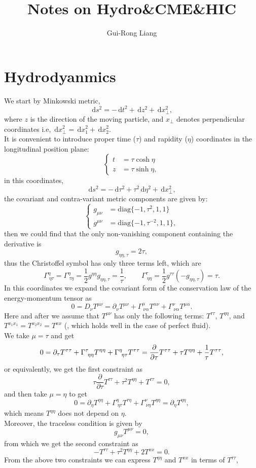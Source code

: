 \documentclass{article}
\title{Notes on Hydro\&CME\&HIC}
\author{Gui-Rong Liang}
\newcommand{\be}{\begin{equation}}
\newcommand{\ee}{\end{equation}}
\newcommand{\dif}{\,\mathrm{d}}
\newcommand{\p}{\partial}
\newcommand{\1}{\left}
\newcommand{\2}{\right}
\newcommand{\m}{\mu}
\newcommand{\n}{\nu}
\newcommand{\al}{\alpha}
\begin{document}
\maketitle
\tableofcontents
\newpage

\section{Hydrodyanmics}
We start by Minkowski metric,
\be
\dif s^2=-\dif t^2+\dif z^2+\dif x_{\perp}^2,
\ee 
where $z$ is the direction of the moving particle, and $x_\perp$ denotes perpendicular coordinates i.e, $\dif x_{\perp}^2=\dif x_{1}^2+\dif x_{2}^2$.\\
It is convenient to introduce proper time ($\tau$) and rapidity ($\eta$) coordinates in the longitudinal position plane:
\be\1\{\begin{split}
t&=\tau \cosh \eta\\
z&=\tau \sinh \eta,
\end{split}\2.\ee
in this coordinates,
\be
\dif s^2=-\dif \tau^2+\tau^2 \dif\eta^2 +\dif x_{\perp}^2,
\ee
the covariant and contra-variant metric components are given by:
\be\1\{\begin{split}
g_{\m\n}&=\text{diag}\{-1,\tau^2,1,1\}\\
g^{\m\n}&=\text{diag}\{-1,\tau^{-2},1,1\},
\end{split}\2.\ee
then we could find that the only non-vanishing component containing the derivative is 
\be
g_{\eta\eta,\tau}=2\tau,
\ee
thus the Christoffel symbol has only three terms left, which are
\be
\Gamma^\eta_{\ \eta\tau}=\Gamma^\eta_{\ \tau\eta}=\frac 1 2 g^{\eta\eta}g_{\eta\eta,\tau}=\frac 1 \tau, \qquad \Gamma^\tau_{\ \eta\eta}=\frac 1 2 g^{\tau\tau}(-g_{\eta\eta,\tau})=\tau.
\ee
In this coordinates we expand the covariant form of the conservation law of the energy-momentum tensor as 
\be
0=D_\n T^{\m\n}=\p_\n T^{\m\n}+\Gamma^\m_{\ \n\al}T^{\al\n}+\Gamma^\n_{\ \n\al}T^{\m\al}.
\ee
Here and after we assume that $T^{\m\n}$ has only the following terms: $T^{\tau\tau}$, $T^{\eta\eta}$, and $T^{x_1x_1}=T^{x_2x_2}=T^{xx}$ (, which holds well in the case of perfect fluid).\\
We take $\m=\tau$ and get 
\be
0=\p_\tau T^{\tau\tau}+\Gamma^\tau_{\ \eta\eta}T^{\eta\eta}+\Gamma^\eta_{\ \eta\tau}T^{\tau\tau}\\
=\frac \p {\p\tau} T^{\tau\tau}+\tau T^{\eta\eta}+\frac 1 \tau T^{\tau\tau},
\ee
or equivalently, we get the first constraint as
\be
\tau\frac \p {\p\tau} T^{\tau\tau}+\tau^2 T^{\eta\eta}+T^{\tau\tau}=0,
\ee
and then take $\m=\eta$ to get
\be
0=\p_\eta T^{\eta\eta}+\Gamma^\eta_{\ \eta\tau}T^{\tau\eta}+\Gamma^\n_{\ \n\eta}T^{\eta\eta}=\p_\eta T^{\eta\eta},
\ee
which means $T^{\eta\eta}$ does not depend on $\eta$.\\
Moreover, the traceless condition is given by
\be
g_{\m\n}T^{\m\n}=0,
\ee
from which we get the second constraint as 
\be
-T^{\tau\tau}+\tau^2T^{\eta\eta}+2T^{xx}=0.
\ee
From the above two constraints we can express $T^{\eta\eta}$ and $T^{xx}$ in terms of $T^{\tau\tau}$,
\end{document}
